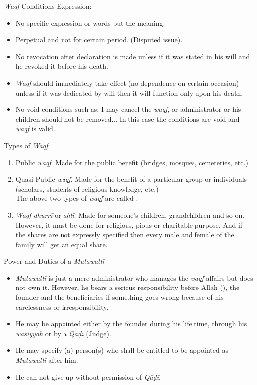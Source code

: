 \begin{frame}{\textit{Waqf} Conditions}
 Expression:
\begin{itemize}
\item No specific expression or words but the meaning.
\item Perpetual and not for certain period. (Disputed issue).
\item No revocation after declaration is made unless if it was stated in his will and he revoked it before his death.
\item \textit{Waqf} should immediately take effect (no dependence on certain occasion) unless if it was dedicated by will then it will function only upon his death.
\item No void conditions such as: I may cancel the \textit{waqf}, or administrator or his children should not be removed... In this case the conditions are void and  \textit{waqf} is valid.
\end{itemize}
\end{frame}

\begin{frame}{Types of \textit{Waqf}}
\begin{enumerate}
\item Public \textit{waqf}. Made for the public benefit (bridges, mosques, cemeteries, etc.)
\item Quasi-Public \textit{waqf}. Made for the benefit of a particular group or individuals (scholars, students of religious knowledge, etc.)\\
The above two types of \textit{waqf} are called {}.
\item \textit{Waqf dhurrī} or \textit{ahlī}. Made for someone’s children, grandchildren and so on. However, it must be done for religious, pious or charitable purpose. And if the shares are not expressly specified then every male and female of the family will get an equal share.
\end{enumerate}
\end{frame}

\begin{frame}{Power and Duties of a \textit{Mutawallī}}
\begin{itemize}
\item \textit{Mutawallī} is just a mere administrator who manages the \textit{waqf} affairs but does not own it. However, he bears a serious responsibility before Allah ({}), the founder and the beneficiaries if something goes wrong because of his carelessness or irresponsibility.
\item He may be appointed either by the founder during his life time, through his \textit{wasiyyah} or by a \textit{Qāḍī} (Judge).
\item He may specify (a) person(s) who shall be entitled to be appointed as \textit{Mutawallī} after him.
\item He can not give up without permission of \textit{Qāḍī}.
\end{itemize}
\end{frame}

